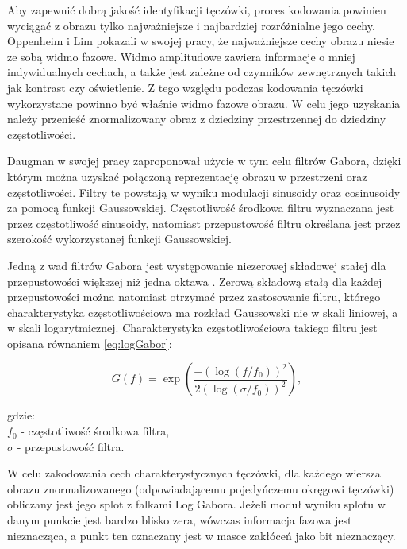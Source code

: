 \documentclass[10pt,polish,a4paper,oneside]{ppfcmthesis}
\begin{document}
Aby zapewni\'c dobrą jakoś\'c identyfikacji tęczówki, proces kodowania powinien wyciąga\'c
z obrazu tylko najważniejsze i najbardziej rozróżnialne jego cechy.
Oppenheim i Lim \cite{OppenheimLim} pokazali w swojej pracy, że najważniejsze
cechy obrazu niesie ze sobą widmo fazowe. Widmo amplitudowe zawiera
informacje o mniej indywidualnych cechach, a także jest zależne od czynników zewnętrznych takich
jak kontrast czy oświetlenie. Z tego względu podczas kodowania tęczówki wykorzystane
powinno by\'c właśnie widmo fazowe obrazu. W celu jego uzyskania należy przenieś\'c znormalizowany
obraz z dziedziny przestrzennej do dziedziny częstotliwości.\newline

Daugman \cite{DaugmanHowIrisRecognitionWorks} w swojej pracy zaproponował użycie w tym celu
filtrów Gabora, dzięki którym można uzyska\'c połączoną reprezentację obrazu w przestrzeni
oraz częstotliwości. Filtry te powstają w wyniku modulacji sinusoidy oraz cosinusoidy za pomocą
funkcji Gaussowskiej.
Częstotliwoś\'c środkowa filtru wyznaczana jest przez częstotliwoś\'c sinusoidy, natomiast
przepustowoś\'c filtru określana jest przez szerokoś\'c wykorzystanej funkcji Gaussowskiej.

Jedną z wad filtrów Gabora jest występowanie niezerowej składowej stałej dla przepustowości
większej niż jedna oktawa \cite{FieldGaborOctave}. Zerową składową stałą dla każdej przepustowości
można natomiast otrzyma\'c przez zastosowanie filtru, którego charakterystyka częstotliwościowa
ma rozkład Gaussowski nie w skali liniowej, a w skali logarytmicznej. Charakterystyka
częstotliwościowa takiego filtru jest opisana równaniem \ref{eq:logGabor}:

\begin{equation}
  \mathit{G(f)} = \exp\left(
  \frac{
    -\left( \log\left( f / f_{0}\right)\right)^{2}
  }{
    2\left(\log\left( \sigma / f_{0}\right)\right)^{2}
  }
  \right),
  \label{eq:logGabor}
\end{equation}

\noindent
gdzie:\\
\indent $f_{0}$ - częstotliwoś\'c środkowa filtra,\\
\indent $\sigma$ - przepustowoś\'c filtra.\newline

W celu zakodowania cech charakterystycznych tęczówki, dla każdego wiersza obrazu znormalizowanego (odpowiadającemu pojedyńczemu
okręgowi tęczówki) obliczany jest jego splot z falkami Log Gabora. Jeżeli moduł wyniku splotu w danym punkcie
jest bardzo blisko zera, wówczas informacja fazowa jest nieznacząca, a punkt ten oznaczany jest w
masce zakłóceń jako bit nieznaczący.
\end{document}
